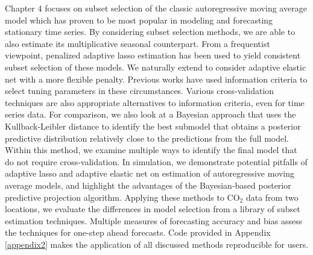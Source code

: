 Chapter 4 focuses on subset selection of the classic autoregressive moving average model which has proven to be most popular in modeling and forecasting stationary time series. By considering subset selection methods, we are able to also estimate its multiplicative seasonal counterpart. From a frequentist viewpoint, penalized adaptive lasso estimation has been used to yield consistent subset selection of these models. We naturally extend to consider adaptive elastic net with a more flexible penalty. Previous works have used information criteria to select tuning parameters in these circumstances. Various cross-validation techniques are also appropriate alternatives to information criteria, even for time series data. For comparison, we also look at a Bayesian approach that uses the Kullback-Leibler distance to identify the best submodel that obtains a posterior predictive distribution relatively close to the predictions from the full model. Within this method, we examine multiple ways to identify the final model that do not require cross-validation. In simulation, we demonstrate potential pitfalls of adaptive lasso and adaptive elastic net on estimation of autoregressive moving average models, and highlight the advantages of the Bayesian-based posterior predictive projection algorithm. Applying these methods to $\textrm{CO}_2$ data from two locations, we evaluate the differences in model selection from a library of subset estimation techniques. Multiple measures of forecasting accuracy and bias assess the techniques for one-step ahead forecasts. Code provided in Appendix \ref{appendix2} makes the application of all discussed methods reproducible for users.